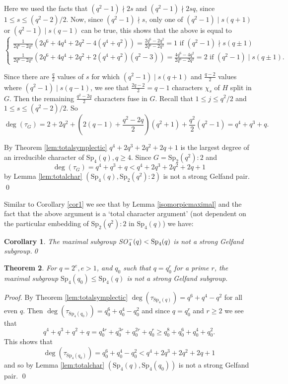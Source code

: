 \documentclass{amsart}
\newtheorem{thm}{Theorem}[section]
\newtheorem{cor}[thm]{Corollary}
\begin{document}
Here we used the facts that $(q^2-1)\nmid 2s$ and $(q^2-1) \nmid 2sq$, since $1\le s\le (q^2-2)/2$. Now, since $(q^2-1) \nmid s$, only one of $(q^2-1) \mid s(q+1)$ or $(q^2-1) \mid s(q-1)$ can be true, this shows that the above is equal to 
$$ \begin{cases}
\frac{1}{2q^6-2q^2}\left(2q^6+4q^4+2q^2 -4(q^4+q^2)\right) = \frac{2q^6-2q^2}{2q^6-2q^2} =1 \text{ if } (q^2-1) \nmid s(q\pm 1)\\
\frac{1}{2q^6-2q^2}\left(2q^6+4q^4+2q^2 +  2(q^4+q^2)(q^2-3)\right) = \frac{4q^6-4q^2}{2q^6-2q^2} = 2 \text{ if } (q^2-1) \mid s(q\pm 1).
\end{cases}
$$

Since there are $\frac{q}{2}$ values of $s$ for which $(q^2-1) \mid s(q+1)$ and $\frac{q-2}{2}$ values where $(q^2-1) \mid s(q-1)$,  we see  that $\frac{2q-2}{2}=q-1$ characters $\chi_s$ of $H$ split in $G$. Then the remaining $\frac{q^2-2q}{2}$ characters fuse in $G$. Recall that $1\leq j \leq q^2/2$ and $1 \leq s \leq (q^2-2)/2$. 
So 
$$
\deg\left(\tau_{G}\right) = 2 + 2q^2 + \left(2(q-1) + \frac{q^2-2q}{2}\right)(q^2+1) + \frac{q^2}{2}\left(q^2-1\right) = q^4+q^3+q.
$$

By Theorem  \ref {lem:totalsymplectic}  $q^4+2q^3+2q^2+2q+1$ is the largest degree of an irreducible character of $\mathrm{Sp}_4(q), q\geq 4$.   Since $G = \mathrm{Sp}_2\left(q^2\right)\colon 2$ and
$$
\deg\left(\tau_{G}\right) =  q^4+q^3+q < q^4+2q^3+2q^2+2q+1
$$
by Lemma \ref {lem:totalchar}  $\left(\mathrm{Sp}_4(q), \mathrm{Sp}_2\left(q^2\right)\colon 2\right)$ is not a strong Gelfand pair.
\qed
\medskip

Similar to Corollary \ref {cor1} we see that by Lemma \ref {isomorpicmaximal} and the fact that the above argument is a `total character argument' (not dependent on the particular embedding of $ \mathrm{Sp}_2(q^2): 2$ in $\mathrm{Sp}_4(q)$)        we have:

\begin{cor} \label  {Cor2} The maximal subgroup {\rm SO}$^-_4(q)<{\rm Sp}_4(q)$ is not a strong Gelfand subgroup.\qed
\end{cor}\medskip
 


\begin{thm}
For $q=2^e, e>1$, and $q_0$ such that $q=q_0^r$ for a prime $r$, the maximal subgroup $\mathrm{Sp}_4(q_0)\leq \mathrm{Sp}_4(q)$ is not a strong Gelfand subgroup.
\end{thm}
\noindent\textit{Proof.} 
By Theorem \ref {lem:totalsymplectic}  $\deg(\tau_{\mathrm{Sp}_4(q)}) = q^6+q^4-q^2$ for all even $q$. Then $\deg(\tau_{\mathrm{Sp}_4(q_0)}) = q_0^6+q_0^4-q_0^2$ and since $q=q_0^r$ and $r\geq 2$ we  see that
$$
q^4+q^3+q^2+q = q_0^{4r}+q_0^{3r}+q_0^{2r}+q_0^r \geq q_0^8+q_0^6+q_0^4+q_0^2.
$$
This shows  that
$$
\deg(\tau_{\mathrm{Sp}_4(q_0)}) = q_0^6+q_0^4-q_0^2 < q^4+2q^3+2q^2+2q+1
$$
and so by Lemma \ref{lem:totalchar} $(\mathrm{Sp}_4(q), \mathrm{Sp}_4(q_0))$ is not a strong Gelfand pair. \qed\medskip
\end{document}
